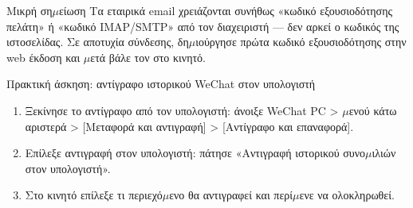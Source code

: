 \begin{tcbinfo}{Μικρή ση$\mu$είωση}
Τα εταιρικά email χρειάζονται συνήθως «κωδικό εξουσιοδότησης πελάτη» ή «κωδικό IMAP/SMTP» από τον διαχειριστή — δεν αρκεί ο κωδικός της ιστοσελίδας. Σε αποτυχία σύνδεσης, δη$\mu$ιούργησε πρώτα κωδικό εξουσιοδότησης στην web έκδοση και $\mu$ετά βάλε τον στο κινητό.

\end{tcbinfo}

\begin{tcbpractice}{Πρακτική άσκηση: αντίγραφο ιστορικού WeChat στον υπολογιστή}
\begin{enumerate}
  \item Ξεκίνησε το αντίγραφο από τον υπολογιστή: άνοιξε WeChat PC > $\mu$ενού κάτω αριστερά > [Μεταφορά και αντιγραφή] > [Αντίγραφο και επαναφορά].
  \item Επίλεξε αντιγραφή στον υπολογιστή: πάτησε «Αντιγραφή ιστορικού συνο$\mu$ιλιών στον υπολογιστή».
  \item Στο κινητό επίλεξε τι περιεχό$\mu$ενο θα αντιγραφεί και περί$\mu$ενε να ολοκληρωθεί.
\end{enumerate}

\end{tcbpractice}

